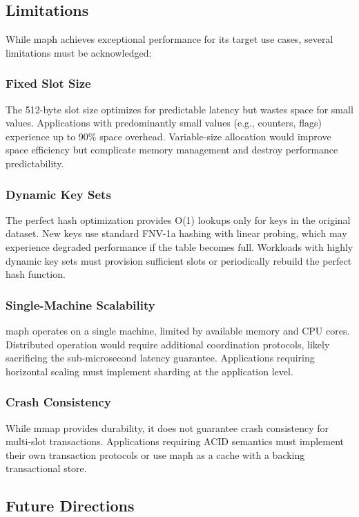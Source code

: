 \documentclass[10pt,conference]{IEEEtran}
\begin{document}
\subsection{Limitations}

While maph achieves exceptional performance for its target use cases, several limitations must be acknowledged:

\subsubsection{Fixed Slot Size}
The 512-byte slot size optimizes for predictable latency but wastes space for small values. Applications with predominantly small values (e.g., counters, flags) experience up to 90\% space overhead. Variable-size allocation would improve space efficiency but complicate memory management and destroy performance predictability.

\subsubsection{Dynamic Key Sets}
The perfect hash optimization provides O(1) lookups only for keys in the original dataset. New keys use standard FNV-1a hashing with linear probing, which may experience degraded performance if the table becomes full. Workloads with highly dynamic key sets must provision sufficient slots or periodically rebuild the perfect hash function.

\subsubsection{Single-Machine Scalability}
maph operates on a single machine, limited by available memory and CPU cores. Distributed operation would require additional coordination protocols, likely sacrificing the sub-microsecond latency guarantee. Applications requiring horizontal scaling must implement sharding at the application level.

\subsubsection{Crash Consistency}
While mmap provides durability, it does not guarantee crash consistency for multi-slot transactions. Applications requiring ACID semantics must implement their own transaction protocols or use maph as a cache with a backing transactional store.

\subsection{Future Directions}
\end{document}
